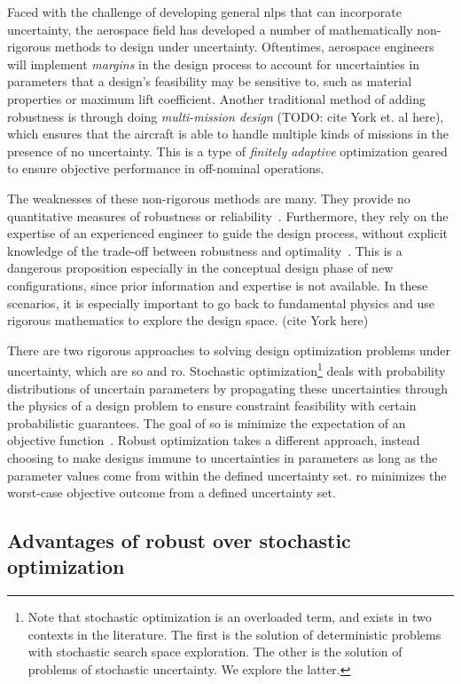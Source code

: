 Faced with the challenge of developing general \gls{nlp}s that can incorporate uncertainty,
the aerospace field has developed a number of mathematically non-rigorous methods to
design under uncertainty. Oftentimes, aerospace engineers will implement
\textit{margins} in the design process to account for uncertainties in parameters that a design's feasibility
may be sensitive to, such as material properties or maximum lift coefficient.
Another traditional method of adding robustness is through doing \textit{multi-mission design}
(TODO: cite York et. al here), which ensures that the aircraft is able to handle
multiple kinds of missions in the presence of no uncertainty. This is a type of \textit{finitely
adaptive} optimization geared to ensure objective performance in off-nominal operations.

The weaknesses of these non-rigorous methods are many. They provide no quantitative measures of
robustness or reliability~\cite{Zang2002}. Furthermore, they rely on the expertise of an experienced
engineer to guide the design process, without explicit knowledge of the trade-off between
robustness and optimality~\cite{yao2011}. This is a dangerous proposition especially in the
conceptual design phase of new configurations, since prior information and expertise is not
available. In these scenarios, it is especially important to go back to fundamental physics
and use rigorous mathematics to explore the design space. (cite York here)

There are two rigorous approaches to solving design optimization problems under uncertainty,
which are \gls{so} and \gls{ro}. Stochastic optimization\footnote{Note that stochastic
optimization is an overloaded term, and exists in two contexts in the literature. The first is the solution
of deterministic problems with stochastic search space exploration. The other is the solution
of problems of stochastic uncertainty. We explore the latter.}
deals with probability distributions of
uncertain parameters by propagating these uncertainties through the
physics of a design problem to ensure constraint feasibility with certain probabilistic guarantees.
The goal of \gls{so} is minimize the expectation of an objective function~\cite{Diwekar2008}.
Robust optimization takes a different approach, instead choosing to make designs immune to
uncertainties in parameters as long as the parameter values come from within the defined
uncertainty set. \gls{ro} minimizes the worst-case objective outcome from a defined uncertainty set.

\subsection{Advantages of robust over stochastic optimization}

